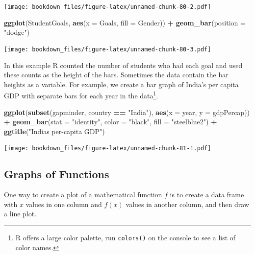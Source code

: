 \documentclass[
]{krantz}
\makeatletter
\newenvironment{Shaded}{\begin{snugshade}}{\end{snugshade}}
\newcommand{\DataTypeTok}[1]{\textcolor[rgb]{0.27,0.27,0.27}{#1}}
\newcommand{\KeywordTok}[1]{\textcolor[rgb]{0.27,0.27,0.27}{\textbf{#1}}}
\newcommand{\NormalTok}[1]{#1}
\newcommand{\OperatorTok}[1]{\textcolor[rgb]{0.43,0.43,0.43}{\textbf{#1}}}
\newcommand{\StringTok}[1]{\textcolor[rgb]{0.5,0.5,0.5}{#1}}
\newenvironment{kframe}{%
\medskip{}
\setlength{\fboxsep}{.8em}
 \def\at@end@of@kframe{}%
 \ifinner\ifhmode%
  \def\at@end@of@kframe{\end{minipage}}%
  \begin{minipage}{\columnwidth}%
 \fi\fi%
 \def\FrameCommand##1{\hskip\@totalleftmargin \hskip-\fboxsep
 \colorbox{shadecolor}{##1}\hskip-\fboxsep
     \hskip-\linewidth \hskip-\@totalleftmargin \hskip\columnwidth}%
 \MakeFramed {\advance\hsize-\width
   \@totalleftmargin\z@ \linewidth\hsize
   \@setminipage}}%
 {\par\unskip\endMakeFramed%
 \at@end@of@kframe}
\renewenvironment{Shaded}{\begin{kframe}}{\end{kframe}}
\makeatother
\begin{document}
\texttt{[image: bookdown\_files/figure-latex/unnamed-chunk-80-2.pdf]}

\begin{Shaded}
\begin{Highlighting}[]
\KeywordTok{ggplot}\NormalTok{(StudentGoals, }\KeywordTok{aes}\NormalTok{(}\DataTypeTok{x =}\NormalTok{ Goals, }\DataTypeTok{fill =}\NormalTok{ Gender)) }\OperatorTok{+}\StringTok{ }
\StringTok{    }\KeywordTok{geom\_bar}\NormalTok{(}\DataTypeTok{position =} \StringTok{"dodge"}\NormalTok{)}
\end{Highlighting}
\end{Shaded}

\texttt{[image: bookdown\_files/figure-latex/unnamed-chunk-80-3.pdf]}

In this example R counted the number of students who had each goal and used these counts as the height of the bars. Sometimes the data contain the bar heights as a variable. For example, we create a bar graph of India's per capita GDP with separate bars for each year in the data\footnote{R offers a large color palette, run \texttt{colors()} on the console to see a list of color names.}.

\begin{Shaded}
\begin{Highlighting}[]
\KeywordTok{ggplot}\NormalTok{(}\KeywordTok{subset}\NormalTok{(gapminder, country }\OperatorTok{==}\StringTok{ "India"}\NormalTok{), }\KeywordTok{aes}\NormalTok{(}\DataTypeTok{x =}\NormalTok{ year, }\DataTypeTok{y =}\NormalTok{ gdpPercap)) }\OperatorTok{+}\StringTok{ }
\StringTok{    }\KeywordTok{geom\_bar}\NormalTok{(}\DataTypeTok{stat =} \StringTok{"identity"}\NormalTok{, }\DataTypeTok{color =} \StringTok{"black"}\NormalTok{, }\DataTypeTok{fill =} \StringTok{"steelblue2"}\NormalTok{) }\OperatorTok{+}\StringTok{ }
\StringTok{    }\KeywordTok{ggtitle}\NormalTok{(}\StringTok{"India\textquotesingle{}s per{-}capita GDP"}\NormalTok{)}
\end{Highlighting}
\end{Shaded}

\texttt{[image: bookdown\_files/figure-latex/unnamed-chunk-81-1.pdf]}

\hypertarget{graphs-of-functions}{%
\subsection{Graphs of Functions}\label{graphs-of-functions}}

One way to create a plot of a mathematical function \(f\) is to create a data frame with \(x\) values in one column and \(f(x)\) values in another column, and then draw a line plot.
\end{document}
